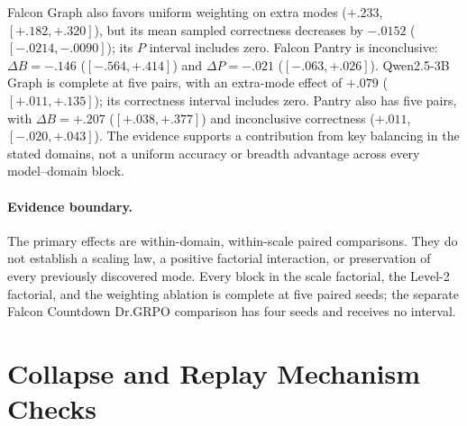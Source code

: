 \documentclass{article}
\newcommand{\1}{\mathbf 1}
\theoremstyle{remark}
\theoremstyle{definition}
\theoremstyle{plain}
\begin{document}
Falcon Graph also favors uniform weighting on extra modes ($+.233$,
$[+.182,+.320]$), but its mean sampled correctness decreases by $-.0152$
($[-.0214,-.0090]$); its $P$ interval includes zero. Falcon Pantry is
inconclusive: $\Delta B=-.146$ ($[-.564,+.414]$) and $\Delta P=-.021$
($[-.063,+.026]$). Qwen2.5-3B Graph is complete at five pairs, with an extra-mode effect of
$+.079$ ($[+.011,+.135]$); its correctness interval includes zero.
Pantry also has five pairs, with $\Delta B=+.207$
($[+.038,+.377]$) and inconclusive correctness ($+.011$, $[-.020,+.043]$).
The evidence supports a contribution from key balancing in the stated domains, not a
uniform accuracy or breadth advantage across every model--domain block.

\paragraph{Evidence boundary.}
\label{app:scale-boundary}
The primary effects are within-domain, within-scale paired comparisons.
They do not establish a scaling law, a positive factorial interaction, or
preservation of every previously discovered mode. Every block in the scale
factorial, the Level-2 factorial, and the weighting ablation is complete at
five paired seeds; the separate Falcon Countdown Dr.GRPO comparison has four
seeds and receives no interval.



\section{Collapse and Replay Mechanism Checks}
\label{app:ablations}


\end{document}
